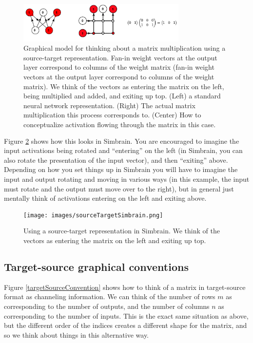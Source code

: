 \begin{figure}[h]
\centering
\includegraphics[width=0.75\textwidth]{images/sourceTarget.png}
\caption[Jeff Yoshimi.]{Graphical model for thinking about a matrix multiplication using a source-target representation. Fan-in weight vectors at the output layer correspond to columns of the weight matrix (fan-in weight vectors at the output layer correspond to columns of the weight matrix). We think of the vectors as entering the matrix on the left, being multiplied and added, and exiting up top. (Left) a standard neural network representation. (Right) The actual matrix multiplication this process corresponds to. (Center) How to conceptualize activation flowing through the matrix in this case. }
\label{sourceTargetConvention}
\end{figure}

Figure \ref{sourceTargetSimbrain} shows how this looks in Simbrain. You are encouraged to imagine  the input activations being rotated and ``entering'' on the left (in Simbrain, you can also rotate the presentation of the input vector), and then ``exiting'' above. Depending on how you set things up in Simbrain you will have to imagine the input and output rotating and moving in various ways (in this example, the input must rotate and the output must move over to the right), but in general just mentally think of activations entering on the left and exiting above.

\begin{figure}[h]
\centering
\texttt{[image: images/sourceTargetSimbrain.png]}
\caption[Jeff Yoshimi.]{Using a source-target representation in Simbrain. We think of the vectors as entering the matrix on the left and exiting up top.}
\label{sourceTargetSimbrain}
\end{figure}

\subsection{Target-source graphical conventions}

Figure \ref{targetSourceConvention} shows how to think of a matrix in target-source format as channeling information. We can think of the number of rows $m$ as corresponding to the number of outputs, and the number of columns $n$ as corresponding to the number of inputs. This is the exact same situation as above, but the different order of the indices creates a different shape for the matrix, and so we  think about things in this alternative way. 

